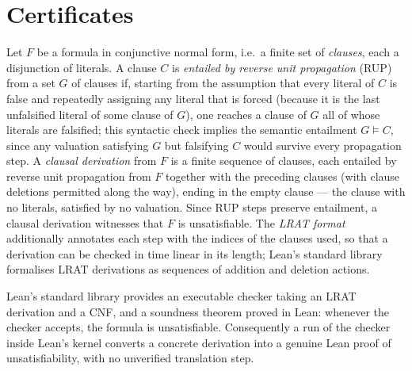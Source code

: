 \chapter{Certificates}\label{sec:certificates}

\begin{definition}\label{def:lrat}
Let $F$ be a formula in conjunctive normal form, i.e.\ a finite set of
\emph{clauses}, each a disjunction of literals.  A clause $C$ is
\emph{entailed by reverse unit propagation} (RUP) from a set $G$ of clauses
if, starting from the assumption that every literal of $C$ is false and
repeatedly assigning any literal that is forced (because it is the last
unfalsified literal of some clause of $G$), one reaches a clause of $G$ all
of whose literals are falsified; this syntactic check implies the semantic
entailment $G \models C$, since any valuation satisfying $G$ but falsifying
$C$ would survive every propagation step.  A \emph{clausal derivation} from
$F$ is a finite sequence of clauses, each entailed by reverse unit
propagation from $F$ together with the preceding clauses (with clause
deletions permitted along the way), ending in the empty clause --- the
clause with no literals, satisfied by no valuation.  Since RUP steps
preserve entailment, a clausal derivation witnesses that $F$ is
unsatisfiable.  The \emph{LRAT format} additionally annotates each step
with the indices of the clauses used, so that a derivation can be checked
in time linear in its length; Lean's standard library formalises LRAT
derivations as sequences of addition and deletion actions.
\leanok
\end{definition}

\begin{theorem}\label{crt-checker}
Lean's standard library provides an executable checker taking an LRAT
derivation and a CNF, and a soundness theorem proved in Lean: whenever the
checker accepts, the formula is unsatisfiable.  Consequently a run of the
checker inside Lean's kernel converts a concrete derivation into a genuine
Lean proof of unsatisfiability, with no unverified translation step.
\leanok
{}
\end{theorem}


